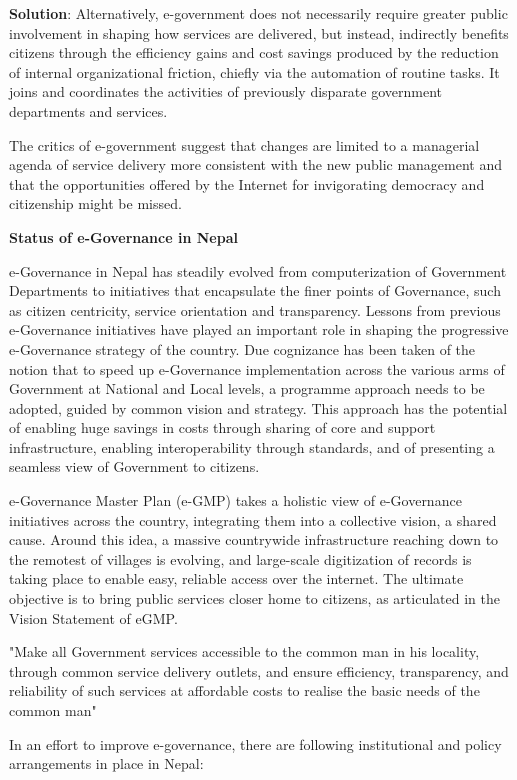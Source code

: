 \documentclass[
]{book}
\newenvironment{solution}{ {\bfseries Solution}:}{}
\begin{document}
\begin{questions}
\begin{solution}
Alternatively, e-government does not necessarily require greater public involvement in shaping how services are delivered, but instead, indirectly benefits citizens through the efficiency gains and cost savings produced by the reduction of internal organizational friction, chiefly via the automation of routine tasks. It joins and coordinates the activities of previously disparate government departments and services.

The critics of e-government suggest that changes are limited to a managerial agenda of service delivery more consistent with the new public management and that the opportunities offered by the Internet for invigorating democracy and citizenship might be missed.

\textbf{Status of e-Governance in Nepal}

e-Governance in Nepal has steadily evolved from computerization of Government Departments to initiatives that encapsulate the finer points of Governance, such as citizen centricity, service orientation and transparency. Lessons from previous e-Governance initiatives have played an important role in shaping the progressive e-Governance strategy of the country. Due cognizance has been taken of the notion that to speed up e-Governance implementation across the various arms of Government at National and Local levels, a programme approach needs to be adopted, guided by common vision and strategy. This approach has the potential of enabling huge savings in costs through sharing of core and support infrastructure, enabling interoperability through standards, and of presenting a seamless view of Government to citizens.

e-Governance Master Plan (e-GMP) takes a holistic view of e-Governance initiatives across the country, integrating them into a collective vision, a shared cause. Around this idea, a massive countrywide infrastructure reaching down to the remotest of villages is evolving, and large-scale digitization of records is taking place to enable easy, reliable access over the internet. The ultimate objective is to bring public services closer home to citizens, as articulated in the Vision Statement of eGMP.

"Make all Government services accessible to the common man in his locality, through common service delivery outlets, and ensure efficiency, transparency, and reliability of such services at affordable costs to realise the basic needs of the common man"

In an effort to improve e-governance, there are following institutional and policy arrangements in place in Nepal:


\end{solution}
\end{questions}
\end{document}
